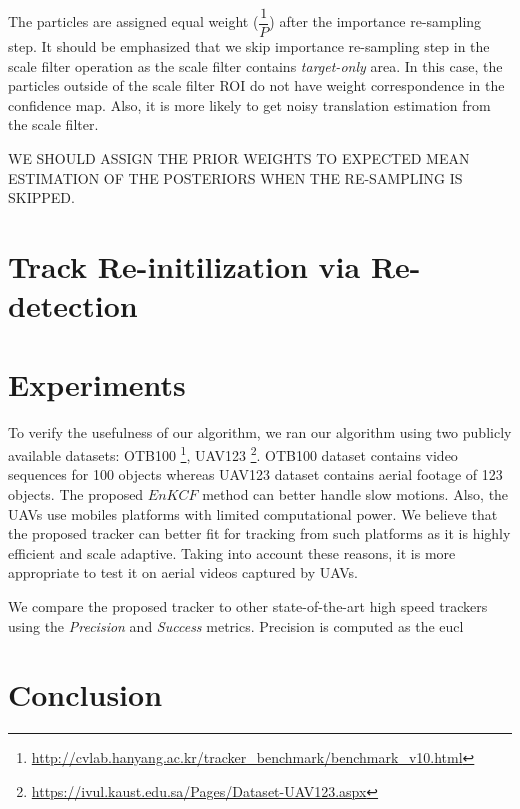 \documentclass[10pt,twocolumn,letterpaper]{article}
\newcounter{ct}
\begin{document}
The particles are assigned equal weight ($\dfrac{1}{P}$) after the
importance re-sampling step. It should be emphasized that we skip
importance re-sampling step in the scale filter operation as the scale
filter contains \textit{target-only} area. In this case, the particles
outside of the scale filter ROI do not have weight correspondence in
the confidence map. Also, it is more likely to get noisy translation
estimation from the scale filter.

WE SHOULD ASSIGN THE PRIOR WEIGHTS TO EXPECTED MEAN ESTIMATION OF THE
POSTERIORS WHEN THE RE-SAMPLING IS SKIPPED.
\section{Track Re-initilization via Re-detection}
\label{sc:Re-initialization}


\section{Experiments} \label{sc:Experiments}
To verify the usefulness of our algorithm, we ran our algorithm using
two publicly available datasets:
OTB100 \footnote{\url{http://cvlab.hanyang.ac.kr/tracker_benchmark/benchmark_v10.html}},
UAV123 \footnote{\url{https://ivul.kaust.edu.sa/Pages/Dataset-UAV123.aspx}}\cite{mueller2016uav123}. OTB100 dataset contains video sequences for 100 objects whereas UAV123 dataset contains aerial footage of 123 objects. The proposed $EnKCF$ method can better handle slow motions. Also, the UAVs use mobiles platforms with limited computational power. We believe that the proposed tracker can better fit for tracking from such platforms as it is highly efficient and scale adaptive. Taking into account these reasons, it is more appropriate to test it on aerial videos captured by UAVs. 

We compare the proposed tracker to other state-of-the-art high speed trackers using the \textit{Precision} and \textit{Success} metrics. Precision is computed as the eucl%


\section{Conclusion} \label{sc:Conclusion}


\small


\end{document}
